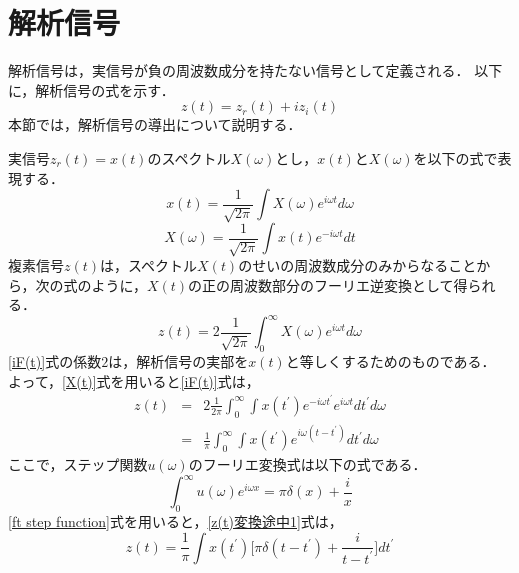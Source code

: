 \section{解析信号}
%
解析信号は，実信号が負の周波数成分を持たない信号として定義される．
以下に，解析信号の式を示す．%
\begin{equation}
    \label{analyse signal}
    z(t) = z_{r}(t) + iz_{i}(t)
\end{equation}
本節では，解析信号の導出について説明する．

実信号$z_{r}(t) = x(t)$のスペクトル$X(\omega)$とし，$x(t)$と$X(\omega)$を以下の式で表現する．
\begin{equation}
    \label{x(t)}
    x(t) = \frac{1}{\sqrt{2\pi}} \int X(\omega) e^{i \omega t} d\omega
\end{equation}
%
\begin{equation}
    \label{X(t)}
    X(\omega) = \frac{1}{\sqrt{2\pi}} \int x(t) e^{-i\omega t} dt
\end{equation}
%
複素信号$z(t)$は，スペクトル$X(t)$のせいの周波数成分のみからなることから，次の式のように，$X(t)$の正の周波数部分のフーリエ逆変換として得られる．
\begin{equation}
    \label{iF(t)}
    z(t) = 2 \frac{1}{\sqrt{2\pi}} \int_{0}^{\infty} X(\omega) e^{i\omega t} d\omega
\end{equation}
%
\ref{iF(t)}式の係数$2$は，解析信号の実部を$x(t)$と等しくするためのものである．
よって，\ref{X(t)}式を用いると\ref{iF(t)}式は，
%
\begin{eqnarray}
    z(t) &=& 2 \frac{1}{2\pi} \int_{0}^{\infty} \int x(t^{\prime}) e^{-i\omega t^{\prime}} e^{i\omega t} dt^{\prime} d\omega \\
         &=& \frac{1}{\pi} \int_{0}^{\infty} \int x(t^{\prime}) e^{i\omega (t - t^{\prime})} dt^{\prime} d\omega \label{z(t)変換途中1}
\end{eqnarray}
%
ここで，ステップ関数$u(\omega)$のフーリエ変換式は以下の式である．
\begin{equation}
    \label{ft step function}
    \int_{0}^{\infty} u(\omega) e^{i \omega x} = \pi \delta (x) + \frac{i}{x}
\end{equation}
%
\ref{ft step function}式を用いると，\ref{z(t)変換途中1}式は，
\begin{equation}
    z(t) = \frac{1}{\pi} \int x(t^{\prime}) \biggl[ \pi \delta (t - t^{\prime}) + \frac{i}{t - t^{\prime}} \biggr] dt^{\prime}
\end{equation}
